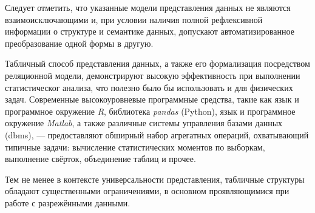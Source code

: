 Следует отметить, что указанные модели представления данных не являются
взаимоисключающими и, при условии наличия полной рефлексивной информации
о структуре и семантике данных, допускают автоматизированное преобразование
одной формы в другую.

Табличный способ представления данных, а также его формализация
посредством реляционной модели, демонстрируют высокую эффективность
при выполнении статистическог анализа, что полезно было бы использовать
и для физических задач. Современные высокоуровневые
программные средства, такие
как язык и программное окружение \emph{R},
библиотека \emph{pandas} (Python), язык и программное
окружение \emph{Matlab}, а также различные системы управления
базами данных (\acrshort{dbms}), --- предоставляют обширный
набор агрегатных операций, охватывающий типичные задачи: вычисление
статистических моментов по выборкам, выполнение свёрток, объединение
таблиц и прочее.


Тем не менее в контексте универсальности представления,
табличные структуры обладают существенными ограничениями,
в основном проявляющимися при работе с разрежёнными данными.

